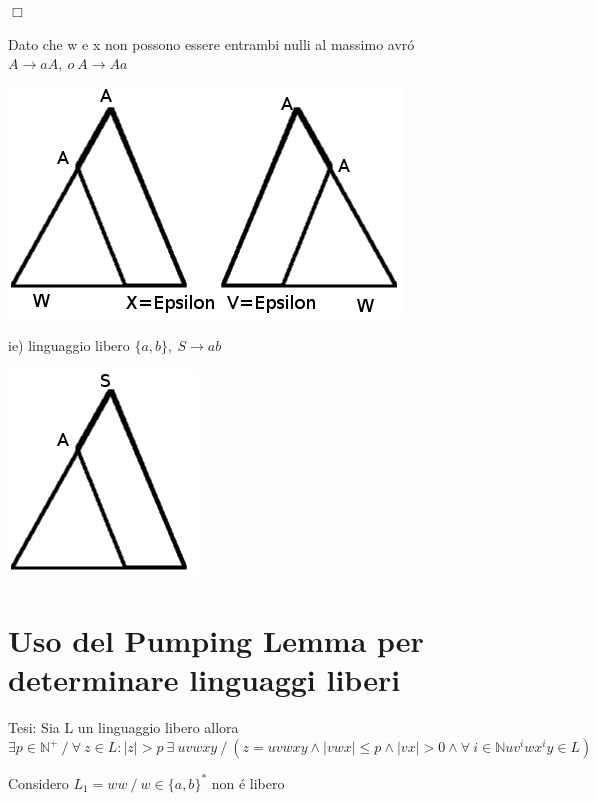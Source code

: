 $\Box$

Dato che w e x non possono essere entrambi nulli al massimo avr\'o  $A \rightarrow aA,\ o\ A \rightarrow Aa$

\begin{center}
\includegraphics[scale=0.4]{Chapters/Img/c01_03.png}
\end{center}

ie) linguaggio libero $\{a,b\},\ S \rightarrow ab$ 
\begin{center}
\includegraphics[scale=0.4]{Chapters/Img/c01_04.png}
\end{center}

\section{Uso del Pumping Lemma per determinare linguaggi liberi}
Tesi: Sia L un linguaggio libero allora 
$\exists p \in \mathbb{N}^+\ / \ \forall\ z \in L:|z|>p\ \exists\ uvwxy \ / \ (z = uvwxy \land |vwx| \leq p \land |vx| > 0 \land \forall\ i \in \mathbb{N} uv^iwx^iy \in L)$

Considero $L_1=ww\ / \ w \in \{a,b\}^*$ non \'e libero


